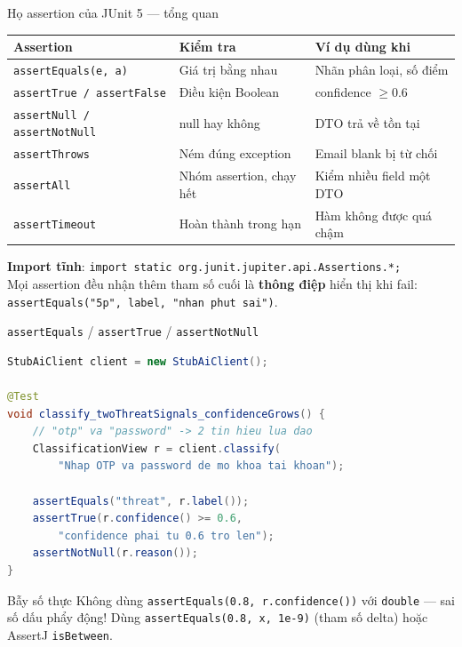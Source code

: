\documentclass[aspectratio=169,12pt]{beamer}
\begin{document}
\begin{frame}{Họ assertion của JUnit 5 --- tổng quan}
  \footnotesize
  \renewcommand{\arraystretch}{1.15}
  \setlength{\tabcolsep}{4pt}
  \begin{tabularx}{\textwidth}{l>{\raggedright\arraybackslash}X>{\raggedright\arraybackslash}X}
    \toprule
    \textbf{Assertion} & \textbf{Kiểm tra} & \textbf{Ví dụ dùng khi} \\
    \midrule
    \texttt{assertEquals(e, a)} & Giá trị bằng nhau & Nhãn phân loại, số điểm \\
    \texttt{assertTrue / assertFalse} & Điều kiện Boolean & confidence \(\ge 0.6\) \\
    \texttt{assertNull / assertNotNull} & null hay không & DTO trả về tồn tại \\
    \texttt{assertThrows} & Ném đúng exception & Email blank bị từ chối \\
    \texttt{assertAll} & Nhóm assertion, chạy hết & Kiểm nhiều field một DTO \\
    \texttt{assertTimeout} & Hoàn thành trong hạn & Hàm không được quá chậm \\
    \bottomrule
  \end{tabularx}
  \renewcommand{\arraystretch}{1}

  \vspace{0.35em}
  {\small \textbf{Import tĩnh}:
  \texttt{import static org.junit.jupiter.api.Assertions.*;}\\
  Mọi assertion đều nhận thêm tham số cuối là \textbf{thông điệp} hiển thị khi
  fail: \texttt{assertEquals("5p", label, "nhan phut sai")}.}
\end{frame}

\begin{frame}[fragile,shrink=8]{\texttt{assertEquals} / \texttt{assertTrue} / \texttt{assertNotNull}}
\begin{lstlisting}[language=java]
StubAiClient client = new StubAiClient();

@Test
void classify_twoThreatSignals_confidenceGrows() {
    // "otp" va "password" -> 2 tin hieu lua dao
    ClassificationView r = client.classify(
        "Nhap OTP va password de mo khoa tai khoan");

    assertEquals("threat", r.label());
    assertTrue(r.confidence() >= 0.6,
        "confidence phai tu 0.6 tro len");
    assertNotNull(r.reason());
}
\end{lstlisting}
  \vspace{-0.2em}
  \begin{alertblock}{Bẫy số thực}
    Không dùng \texttt{assertEquals(0.8, r.confidence())} với \texttt{double}
    --- sai số dấu phẩy động! Dùng \texttt{assertEquals(0.8, x, 1e-9)}
    (tham số delta) hoặc AssertJ \texttt{isBetween}.
  \end{alertblock}
\end{frame}
\end{document}
